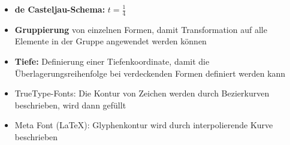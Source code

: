 \documentclass[12pt,landscape]{article}
\begin{document}
\begin{multicols}{3}
\begin{itemize}
\item \textbf{de Casteljau-Schema:} $t = \frac{1}{4}$
\item \textbf{Gruppierung} von einzelnen Formen, damit Transformation auf alle Elemente in der Gruppe angewendet werden können
\item \textbf{Tiefe:} Definierung einer Tiefenkoordinate, damit die Überlagerungsreihenfolge bei verdeckenden Formen definiert werden kann
\item TrueType-Fonts: Die Kontur von Zeichen werden durch Bezierkurven beschrieben, wird dann gefüllt
\item Meta Font (\LaTeX): Glyphenkontur wird durch interpolierende Kurve beschrieben
\end{itemize}

\end{multicols}
\end{document}
